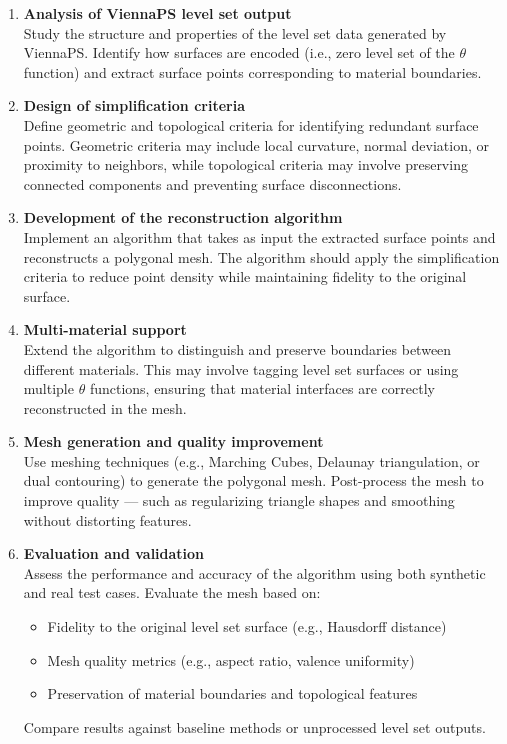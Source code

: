 \documentclass[submission]{eptcs}
\begin{document}
\begin{enumerate}
    \item \textbf{Analysis of ViennaPS level set output} \\
    Study the structure and properties of the level set data generated by ViennaPS. Identify how surfaces are encoded (i.e., zero level set of the $\theta$ function) and extract surface points corresponding to material boundaries.

    \item \textbf{Design of simplification criteria} \\
    Define geometric and topological criteria for identifying redundant surface points. Geometric criteria may include local curvature, normal deviation, or proximity to neighbors, while topological criteria may involve preserving connected components and preventing surface disconnections.

    \item \textbf{Development of the reconstruction algorithm} \\
    Implement an algorithm that takes as input the extracted surface points and reconstructs a polygonal mesh. The algorithm should apply the simplification criteria to reduce point density while maintaining fidelity to the original surface.

    \item \textbf{Multi-material support} \\
    Extend the algorithm to distinguish and preserve boundaries between different materials. This may involve tagging level set surfaces or using multiple $\theta$ functions, ensuring that material interfaces are correctly reconstructed in the mesh.

    \item \textbf{Mesh generation and quality improvement} \\
    Use meshing techniques (e.g., Marching Cubes, Delaunay triangulation, or dual contouring) to generate the polygonal mesh. Post-process the mesh to improve quality — such as regularizing triangle shapes and smoothing without distorting features.

    \item \textbf{Evaluation and validation} \\
    Assess the performance and accuracy of the algorithm using both synthetic and real test cases. Evaluate the mesh based on:
    \begin{itemize}
        \item Fidelity to the original level set surface (e.g., Hausdorff distance)
        \item Mesh quality metrics (e.g., aspect ratio, valence uniformity)
        \item Preservation of material boundaries and topological features
    \end{itemize}
    Compare results against baseline methods or unprocessed level set outputs.
\end{enumerate}
\end{document}
